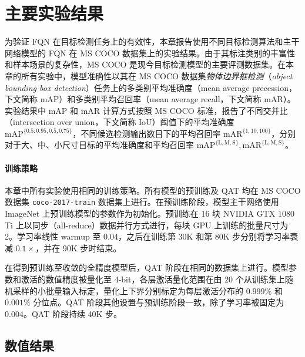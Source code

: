 \documentclass[
  fontset = source,
]{shtthesis}
\providecommand{\mAP}[1]{\mathrm{mAP}^{\mathrm{ #1 }}}
\providecommand{\mAR}[1]{\mathrm{mAR}^{\mathrm{ #1 }}}
\begin{document}
\section{主要实验结果} \label{sec::fqn::experiments}
为验证 FQN 在目标检测任务上的有效性，本章报告使用不同目标检测算法和主干网络模型的 FQN 在 MS COCO 数据集上的实验结果。由于其标注类别的丰富性和样本场景的复杂性，MS COCO 是现今目标检测模型的主要评测数据集。在本章的所有实验中，模型准确性以其在 MS COCO 数据集\emph{物体边界框检测}（\emph{object bounding box detection}）任务上的多类别平均准确度（mean average precession，下文简称 mAP）和多类别平均召回率（mean average recall，下文简称 mAR）。实验结果中 mAP 和 mAR 计算方式按照 MS COCO 标准，报告了不同交并比（intersection over union，下文简称 IoU）阈值下的平均准确度 $\mAP{\{0.5:0.95, 0.5, 0.75\}}$，不同候选检测输出数目下的平均召回率 $\mAR{\{1, 10, 100\}}$，分别对于大、中、小尺寸目标的平均准确度和平均召回率 $\mAP{\{L, M, S\}}, \mAR{\{L, M, S\}}$。

\paragraph{训练策略}
本章中所有实验使用相同的训练策略。所有模型的预训练及 QAT 均在 MS COCO 数据集 \verb|coco-2017-train| 数据集上进行。在预训练阶段，模型主干网络使用 ImageNet 上预训练模型的参数作为初始化。预训练在 16 块 NVIDIA GTX 1080 Ti 上以同步（all-reduce）数据并行方式进行，每块 GPU 上训练的批量尺寸为 2。学习率线性 warmup 至 0.04，之后在训练第 30K 和第 80K 步分别将学习率衰减 $0.1\times$，并在 90K 步时结束。

在得到预训练至收敛的全精度模型后，QAT 阶段在相同的数据集上进行。模型参数和激活的数值精度被量化至 4-bit，各层激活量化范围在由 20 个从训练集上随机采样的小批量输入标定，量化上下界分别标定为每层激活分布的 $0.999\%$ 和 $0.001\%$ 分位点。QAT 阶段其他设置与预训练阶段一致，除了学习率被固定为 $0.004$。QAT 阶段持续 40K 步。
\subsection{数值结果} \label{sec::fqn::main_exp}
\end{document}
